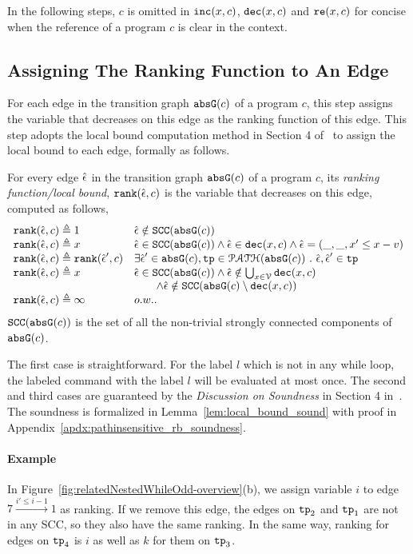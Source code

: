  In the following steps, $c$ is omitted in $\mathtt{inc}(x, c)$,
 $\mathtt{dec}(x, c)$ and $\mathtt{re}(x, c)$ for concise when the reference of a program $c$ is clear in the context.

 \subsection{Assigning The Ranking Function to An Edge}
 For each edge in the transition graph $\mathtt{abs}{\mathtt{G}}(c)$ of a program $c$,
 this step assigns the variable that decreases on this edge as the ranking function of this edge.
 This step adopts the local bound computation method in Section 4 of~\cite{SinnZV17} to assign the local bound to each edge,
 formally as follows.
 \begin{defn}
 \label{def:ranking_gen}
 For every edge $\hat{\mathtt{\epsilon}{}}$ in the transition graph $\mathtt{abs}{\mathtt{G}}(c)$ of a program $c$,
 its \emph{ranking function/local bound}, $\mathtt{rank}(\hat{\mathtt{\epsilon}{}}, c)$
 is the variable that decreases on this edge, computed as follows,
 \[ 
\begin{array}{ll}
 \mathtt{rank}(\hat{\mathtt{\epsilon}{}}, c) \triangleq 1 
 & \hat{\mathtt{\epsilon}{}} \notin \mathtt{SCC}(\mathtt{abs}{\mathtt{G}}(c))
 \\
 \mathtt{rank}(\hat{\mathtt{\epsilon}{}}, c) \triangleq x
 & \hat{\mathtt{\epsilon}{}} \in \mathtt{SCC}(\mathtt{abs}{\mathtt{G}}(c)) \land \hat{\mathtt{\epsilon}{}} \in \mathtt{dec}(x, c) \land \hat{\mathtt{\epsilon}{}} = (\_, \_ , x' \leq x - v) \\
 \mathtt{rank}(\hat{\mathtt{\epsilon}{}}, c) \triangleq \mathtt{rank}(\hat{\mathtt{\epsilon}{}}', c)
 & \exists \hat{\mathtt{\epsilon}{}}' \in \mathtt{abs}{\mathtt{G}}(c), \mathtt{tp} \in \mathcal{PATH}( \mathtt{abs}{\mathtt{G}}(c)) ~.~ \hat{\mathtt{\epsilon}{}}, \hat{\mathtt{\epsilon}{}}' \in \mathtt{tp} \\
 \mathtt{rank}(\hat{\mathtt{\epsilon}{}}, c) \triangleq x
 & \hat{\mathtt{\epsilon}{}} \in \mathtt{SCC}(\mathtt{abs}{\mathtt{G}}(c)) \land 
 \hat{\mathtt{\epsilon}{}} \notin \bigcup_{x \in \mathcal{V}} \mathtt{dec}(x, c) \\
 & \qquad \land \hat{\mathtt{\epsilon}{}} \notin \mathtt{SCC}(\mathtt{abs}{\mathtt{G}}(c) \setminus \mathtt{dec}(x, c))\\
 \mathtt{rank}(\hat{\mathtt{\epsilon}{}}, c) \triangleq \infty
 & o.w..
\end{array}
\]
 $\mathtt{SCC}(\mathtt{abs}{\mathtt{G}}(c))$ is the set of all the non-trivial strongly connected components of $\mathtt{abs}{\mathtt{G}}(c)$.
 \end{defn}
 The first case is straightforward. 
 For the label $l$ which is not in any while loop, 
 the labeled command with the label $l$ will be 
 evaluated at most once. 
 The second and third cases are guaranteed by the \emph{Discussion on Soundness} in Section 4 in~\cite{SinnZV17}.
 The soundness is formalized in Lemma~\ref{lem:local_bound_sound} with proof in Appendix~\ref{apdx:pathinsensitive_rb_soundness}.
 \paragraph{Example}
 In Figure~\ref{fig:relatedNestedWhileOdd-overview}(b), we assign variable $i$ to edge $7 \xrightarrow{i' \leq i - 1} 1$ as ranking.
 If we remove this edge, the edges on $\mathtt{tp}_2$ and $\mathtt{tp}_1$ are not in any SCC, so they also have the same ranking.
In the same way, ranking for edges on $\mathtt{tp}_4$ is $i$ as well as $k$ for them on $\mathtt{tp}_3$.


